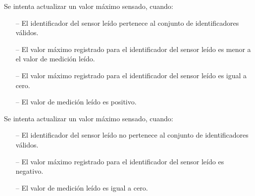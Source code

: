 \begin{tcolorbox}[colback=gray!5!white,colframe=gray!50!black,
  colbacktitle=gray!75!black,title=KeepMaxReading\_SP\_4]
  Se intenta actualizar un valor máximo sensado, cuando:
     \begin{itemize}
        \item[--]{El identificador del sensor leído pertenece al conjunto de identificadores válidos.}
        \item[--]{El valor máximo registrado para el identificador del sensor leído es menor a el valor de medición leído.}
        \item[--]{El valor máximo registrado para el identificador del sensor leído es igual a cero.}
        \item[--]{El valor de medición leído es positivo.}
     \end{itemize}
\end{tcolorbox}



\begin{tcolorbox}[colback=gray!5!white,colframe=gray!50!black,
  colbacktitle=gray!75!black,title=KeepMaxReading\_SP\_7]
  Se intenta actualizar un valor máximo sensado, cuando:
     \begin{itemize}
        \item[--]{El identificador del sensor leído no pertenece al conjunto de identificadores válidos.}
        \item[--]{El valor máximo registrado para el identificador del sensor leído es negativo.}
        \item[--]{El valor de medición leído es igual a cero.}
     \end{itemize}
\end{tcolorbox}


